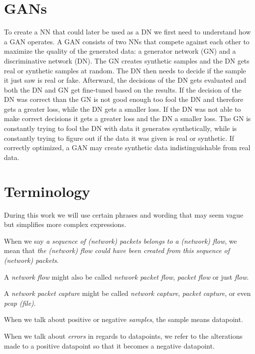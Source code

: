 \documentclass[
	ngerman,
	ruledheaders=section,%
	class=report,%
	thesis={type=bachelor},%
	accentcolor=9c,%
	custommargins=true,%
	marginpar=false,%
	parskip=half-,%
	fontsize=11pt,%
	twoside
]{tudapub}
\begin{document}
\section{GANs}
\label{sec:GAN}

To create a NN that could later be used as a DN we first need to understand how a GAN operates.
A GAN consists of two NNs that compete against each other to maximize the quality of the generated data:
a generator network (GN) and a discriminative network (DN).
The GN creates synthetic samples and the DN gets real or synthetic samples at random.
The DN then needs to decide if the sample it just saw is real or fake.
Afterward, the decisions of the DN gets evaluated and both the DN and GN get fine-tuned based on the results.
If the decision of the DN was correct than the GN is not good enough too fool the DN and therefore gets a greater loss, while the DN gets a smaller loss.
If the DN was not able to make correct decisions it gets a greater loss and the DN a smaller loss.
The GN is constantly trying to fool the DN with data it generates synthetically,
while is constantly trying to figure out if the data it was given is real or synthetic.
If correctly optimized, a GAN may create synthetic data indistinguishable from real data.

\pagebreak

\section{Terminology}
\label{sec:terminology}

During this work we will use certain phrases and wording that may seem vague but simplifies more complex expressions.

When we say \textit{a sequence of (network) packets belongs to a (network) flow}, we mean that \textit{the (network) flow could have been created from this sequence of (network) packets}.

A \textit{network flow} might also be called \textit{network packet flow}, \textit{packet flow} or just \textit{flow}.

A \textit{network packet capture} might be called \textit{network capture}, \textit{packet capture}, or even \textit{pcap (file)}.


When we talk about positive or negative \textit{samples}, the sample means datapoint.

When we talk about \textit{errors} in regards to datapoints, we refer to the alterations made to a positive datapoint so that it becomes a negative datapoint.
\end{document}
